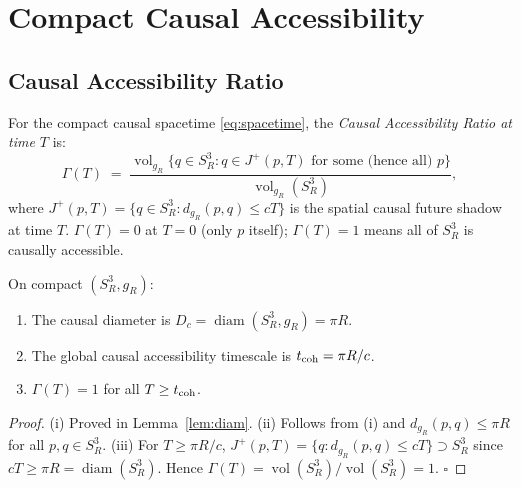 \documentclass[12pt,a4paper]{article}
\theoremstyle{plain}
\theoremstyle{definition}
\theoremstyle{remark}
\newcommand{\vol}{\operatorname{vol}}
\newcommand{\diam}{\operatorname{diam}}
\begin{document}
\section{Compact Causal Accessibility}
\label{sec:accessibility}

\subsection{Causal Accessibility Ratio}

\begin{tcolorbox}[defbox={Definition 4.1 — Causal Accessibility Ratio}]
For the compact causal spacetime \eqref{eq:spacetime},
the \emph{Causal Accessibility Ratio at time $T$} is:
\begin{equation}
  \Gamma(T)
  \;=\;
  \frac{
    \vol_{g_R}\!\bigl\{q \in S^3_R :
    q \in J^+(p,T) \text{ for some (hence all) } p\bigr\}
  }{
    \vol_{g_R}(S^3_R)
  },
  \label{eq:Gamma}
\end{equation}
where $J^+(p,T) = \{q \in S^3_R : d_{g_R}(p,q) \le cT\}$
is the spatial causal future shadow at time $T$.
$\Gamma(T) = 0$ at $T=0$ (only $p$ itself);
$\Gamma(T) = 1$ means all of $S^3_R$ is causally accessible.
\end{tcolorbox}

\begin{tcolorbox}[thmbox={Theorem I — Compact Causal Diameter and Accessibility Timescale}]
\label{thm:I}
On compact $(S^3_R, g_R)$:
\begin{enumerate}[label=\textup{(\roman*)},leftmargin=1.4em]
  \item The causal diameter is
    $D_c = \diam(S^3_R, g_R) = \pi R$.
  \item The global causal accessibility timescale is
    $t_{\rm coh} = \pi R / c$.
  \item $\Gamma(T) = 1$ for all $T \ge t_{\rm coh}$.
\end{enumerate}
\end{tcolorbox}

\begin{proof}
(i) Proved in Lemma~\ref{lem:diam}.
(ii) Follows from (i) and $d_{g_R}(p,q) \le \pi R$ for all $p, q \in S^3_R$.
(iii) For $T \ge \pi R/c$, $J^+(p,T) = \{q : d_{g_R}(p,q) \le cT\} \supset S^3_R$
since $cT \ge \pi R = \diam(S^3_R)$.
Hence $\Gamma(T) = \vol(S^3_R)/\vol(S^3_R) = 1$.
\hfill$\square$
\end{proof}
\end{document}
